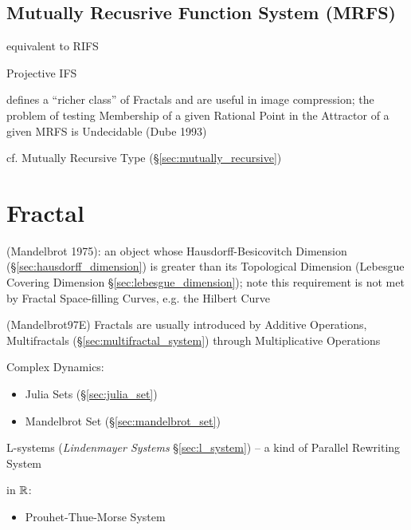 \subsection{Mutually Recusrive Function System (MRFS)}\label{sec:mrfs}

equivalent to RIFS

Projective IFS

defines a ``richer class'' of Fractals and are useful in image compression; the
problem of testing Membership of a given Rational Point in the Attractor of a
given MRFS is Undecidable (Dube 1993)

cf. Mutually Recursive Type (\S\ref{sec:mutually_recursive})



\section{Fractal}\label{sec:fractal}

(Mandelbrot 1975): an object whose Hausdorff-Besicovitch Dimension
(\S\ref{sec:hausdorff_dimension}) is greater than its Topological Dimension
(Lebesgue Covering Dimension \S\ref{sec:lebesgue_dimension}); note this
requirement is not met by Fractal Space-filling Curves, e.g. the Hilbert Curve

(Mandelbrot97E) Fractals are usually introduced by Additive Operations,
Multifractals (\S\ref{sec:multifractal_system}) through Multiplicative
Operations

Complex Dynamics:
\begin{itemize}
  \item Julia Sets (\S\ref{sec:julia_set})
  \item Mandelbrot Set (\S\ref{sec:mandelbrot_set})
\end{itemize}

\asterism

L-systems (\emph{Lindenmayer Systems} \S\ref{sec:l_system}) -- a kind of
Parallel Rewriting System


in $\mathbb{R}$:
\begin{itemize}
  \item Prouhet-Thue-Morse System
\end{itemize}

